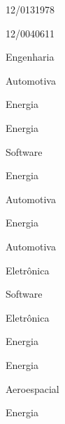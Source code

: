 \begin{folhadeaprovacao}
\begin{minipage}[b]{.15\textwidth}
12/0131978

12/0040611
\end{minipage}
\hspace{\fill}
\begin{minipage}[b]{.15\textwidth}
Engenharia \vspace{2mm}

Automotiva

Energia

Energia

Software

Energia

Automotiva

Energia

Automotiva

Eletrônica

Software

Eletrônica

Energia

Energia

Aeroespacial

Energia
\end{minipage}
\end{folhadeaprovacao}
